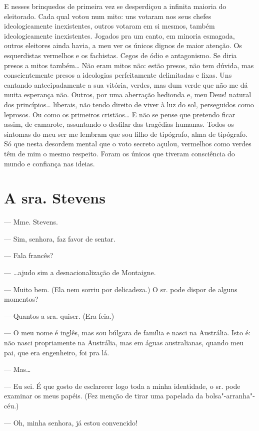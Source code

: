 E nesses brinquedos de primeira vez se desperdiçou a infinita maioria do
eleitorado. Cada qual votou num mito: uns votaram nos seus chefes
ideologicamente inexistentes, outros votaram em si mesmos, também
ideologicamente inexistentes. Jogados pra um canto, em minoria esmagada,
outros eleitores ainda havia, a meu ver os únicos dignos de maior
atenção. Os esquerdistas vermelhos e os fachistas. Cegos de ódio e
antagonismo. Se diria presos a mitos também\ldots{} Não eram mitos não: estão
presos, não tem dúvida, mas conscientemente presos a ideologias
perfeitamente delimitadas e fixas. Uns cantando antecipadamente a sua
vitória, verdes, mas dum verde que não me dá muita esperança não.
Outros, por uma aberração hedionda e, meu Deus! natural dos
princípios\ldots{} liberais, não tendo direito de viver à luz do sol,
perseguidos como leprosos. Ou como os primeiros cristãos\ldots{} E não se
pense que pretendo ficar assim, de camarote, assuntando o desfilar das
tragédias humanas. Todos os sintomas do meu ser me lembram que sou filho
de tipógrafo, alma de tipógrafo. Só que nesta desordem mental que o voto
secreto açulou, vermelhos como verdes têm de mim o mesmo respeito. Foram
os únicos que tiveram consciência do mundo e confiança nas ideias.

\chapter{A sra. Stevens}

--- Mme. Stevens.

--- Sim, senhora, faz favor de sentar.

--- Fala francês?

--- \ldots{}ajudo sim a desnacionalização de Montaigne.

--- Muito bem. (Ela nem sorriu por delicadeza.) O sr. pode dispor de
alguns momentos?

--- Quantos a sra. quiser. (Era feia.)

--- O meu nome é inglês, mas sou búlgara de família e nasci na
Austrália. Isto é: não nasci propriamente na Austrália, mas em águas
australianas, quando meu pai, que era engenheiro, foi pra lá.

--- Mas\ldots{}

--- Eu sei. É que gosto de esclarecer logo toda a minha identidade, o
sr. pode examinar os meus papéis. (Fez menção de tirar uma papelada da
bolsa"-arranha"-céu.)

--- Oh, minha senhora, já estou convencido!

